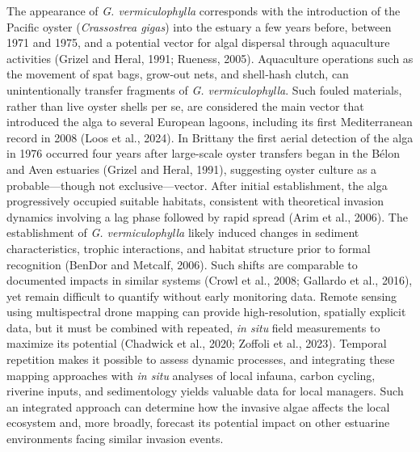 \documentclass[
  letterpaper,
  DIV=11,
  numbers=noendperiod]{scrartcl}
\begin{document}
The appearance of \emph{G. vermiculophylla} corresponds with the
introduction of the Pacific oyster (\emph{Crassostrea gigas}) into the
estuary a few years before, between 1971 and 1975, and a potential
vector for algal dispersal through aquaculture activities (Grizel and
Heral, 1991; Rueness, 2005). Aquaculture operations such as the movement
of spat bags, grow-out nets, and shell‐hash clutch, can unintentionally
transfer fragments of \emph{G. vermiculophylla}. Such fouled materials,
rather than live oyster shells per se, are considered the main vector
that introduced the alga to several European lagoons, including its
first Mediterranean record in 2008 (Loos et al., 2024). In Brittany the
first aerial detection of the alga in 1976 occurred four years after
large-scale oyster transfers began in the Bélon and Aven estuaries
(Grizel and Heral, 1991), suggesting oyster culture as a
probable---though not exclusive---vector. After initial establishment,
the alga progressively occupied suitable habitats, consistent with
theoretical invasion dynamics involving a lag phase followed by rapid
spread (Arim et al., 2006). The establishment of \emph{G.
vermiculophylla} likely induced changes in sediment characteristics,
trophic interactions, and habitat structure prior to formal recognition
(BenDor and Metcalf, 2006). Such shifts are comparable to documented
impacts in similar systems (Crowl et al., 2008; Gallardo et al., 2016),
yet remain difficult to quantify without early monitoring data. Remote
sensing using multispectral drone mapping can provide high-resolution,
spatially explicit data, but it must be combined with repeated, \emph{in
situ} field measurements to maximize its potential (Chadwick et al.,
2020; Zoffoli et al., 2023). Temporal repetition makes it possible to
assess dynamic processes, and integrating these mapping approaches with
\emph{in situ} analyses of local infauna, carbon cycling, riverine
inputs, and sedimentology yields valuable data for local managers. Such
an integrated approach can determine how the invasive algae affects the
local ecosystem and, more broadly, forecast its potential impact on
other estuarine environments facing similar invasion events.
\end{document}
